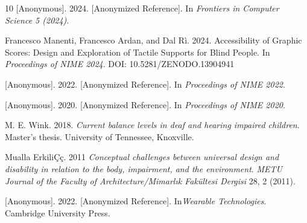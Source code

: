 \documentclass[manuscript,screen,review,anonymous]{acmart}
\begin{document}
\begin{thebibliography}{10}
[Anonymous]. 2024.
[Anonymized Reference].
In \textit{Frontiers in Computer Science 5 (2024)}.



Francesco Manenti, Francesco Ardan, and Dal Rì. 2024.
Accessibility of Graphic Scores: Design and Exploration of Tactile Supports for Blind People.
In \textit{Proceedings of NIME 2024}.
DOI: 10.5281/ZENODO.13904941

[Anonymous]. 2022.
[Anonymized Reference].
In \textit{Proceedings of NIME 2022}.


[Anonymous]. 2020.
[Anonymized Reference].
In \textit{Proceedings of NIME 2020}.


M. E. Wink. 2018.
\textit{Current balance levels in deaf and hearing impaired children}.
Master's thesis. University of Tennessee, Knoxville.

Mualla ErkiliÇ{\c{c}}. 2011
\textit{Conceptual challenges between universal design and disability in relation to the body, impairment, and the environment}.
\textit{METU Journal of the Faculty of Architecture/Mimarl{\i}k Fak{\"u}ltesi Dergisi} 28, 2 (2011).

[Anonymous]. 2022.
[Anonymized Reference].
In\textit{Wearable Technologies}. Cambridge University Press.



\end{thebibliography}
\end{document}
